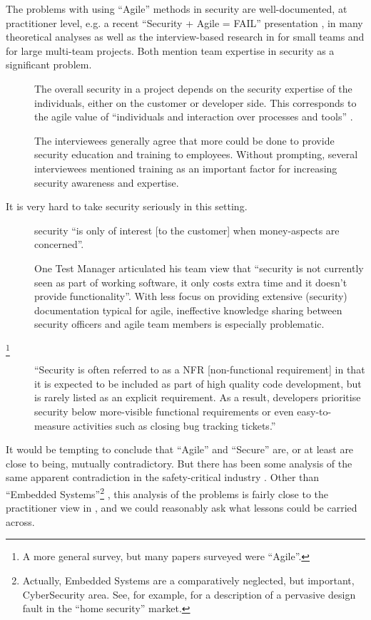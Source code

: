 \documentclass{eptcs}
\begin{document}
The problems with using ``Agile'' methods in security are well-documented, at practitioner level, e.g. a recent ``Security + Agile = FAIL'' presentation \cite{Lane2018a}, in many theoretical analyses as well as the interview-based research in \cite{Bartsch2011a} for small teams and  \cite{vanderHeijdenetal2018a} for large multi-team projects. Both mention team expertise in security as a significant problem.
\begin{description}
\item[\cite{Bartsch2011a}]The
overall security in a project depends on the security expertise
of the individuals, either on the customer or developer side.
This corresponds to the agile value of ``individuals and
interaction over processes and tools'' \cite[Value 1]{Becketal2001}.
\item[\cite{vanderHeijdenetal2018a}]The interviewees
generally agree that more could be done to provide security education
and training to employees. Without prompting, several
interviewees mentioned training as an important factor for increasing
security awareness and expertise. 
\end{description}
It is very hard to take security seriously in this setting.
\begin{description}
\item[\cite{Bartsch2011a}]security ``is only of interest [to the customer] when money-aspects are
concerned''.
\item[\cite{vanderHeijdenetal2018a}]One Test Manager articulated his team view
that ``security is not currently seen as part of working software,
it only costs extra time and it doesn't provide functionality''.  With less focus on
providing extensive (security) documentation typical for agile, ineffective
knowledge sharing between security officers and agile team
members is especially problematic.
\item[\cite{TahaeiVaniea2019a}\footnote{A more general survey, but many papers surveyed were ``Agile''.}]``Security is often referred to as a NFR [non-functional requirement] in that it
is expected to be included as part of high quality code development,
but is rarely listed as an explicit requirement.
As a result, developers prioritise security below more-visible
functional requirements or even easy-to-measure activities
such as closing bug tracking tickets.''
\end{description}
\par\noindent
It would be tempting to conclude that ``Agile'' and ``Secure'' are, or at least are close to being, mutually contradictory. But there has been some analysis of the same apparent contradiction in the safety-critical industry \cite{Chapman2016a}.  Other than ``Embedded Systems''\footnote{Actually, Embedded Systems are a comparatively neglected, but important, CyberSecurity area. See, for example, \cite{OConnoretal2019a} for a description of a pervasive design fault in the ``home security'' market.} \cite[\S 3.6]{Chapman2016a}, this analysis of the problems is fairly close to the practitioner view in \cite{Lane2018a}, and we could reasonably ask what lessons could be carried across. 
\end{document}
